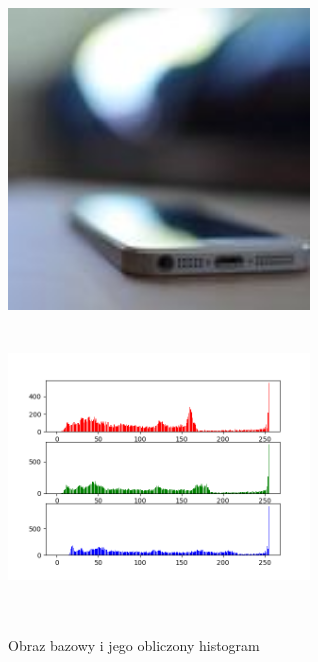 \documentclass[a4paper,12pt]{book}
\begin{document}
\begin{figure}[H]
	\caption{Obraz bazowy i jego obliczony histogram}
	\includegraphics[width=8cm, height=8cm]{phone-unmodified.jpg}
	\includegraphics[width=8cm, height=8cm]{6-1/calculate-phone.png}
\end{figure}
\end{document}
